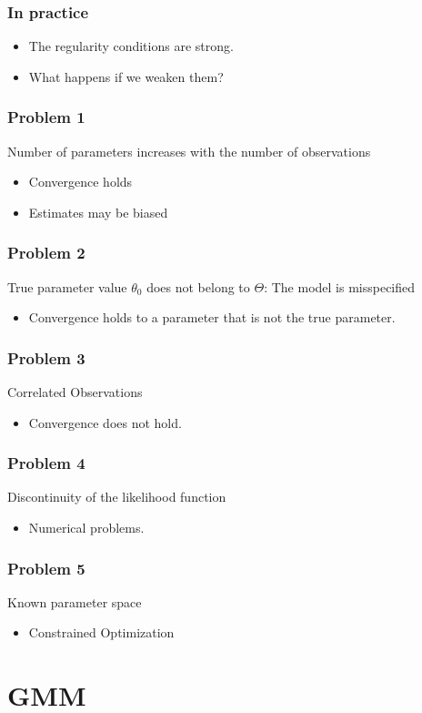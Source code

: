 \documentclass{beamer}
\newcommand{\1}{\mathbb{1}}
\begin{document}
\begin{frame}\frametitle{In practice}
\begin{itemize}
\item The regularity conditions are strong. 
\item What happens if we weaken them?
\end{itemize}
\end{frame}

\begin{frame}\frametitle{Problem 1}
Number of parameters increases with the number of observations
\begin{itemize}
\item Convergence holds
\item Estimates may be biased
\end{itemize}
\end{frame}

\begin{frame}\frametitle{Problem 2}
True parameter value $\theta_0$ does not belong to $\Theta$: The model is misspecified
\begin{itemize}
\item Convergence holds to a parameter that is not the true parameter.
\end{itemize}
\end{frame}

\begin{frame}\frametitle{Problem 3}
Correlated Observations
\begin{itemize}
\item Convergence does not hold. 
\end{itemize}
\end{frame}

\begin{frame}\frametitle{Problem 4}
Discontinuity of the likelihood function
\begin{itemize}
\item Numerical problems.
\end{itemize}
\end{frame}

\begin{frame}\frametitle{Problem 5}
Known parameter space
\begin{itemize}
\item Constrained Optimization
\end{itemize}
\end{frame}

\section{GMM}
\end{document}
